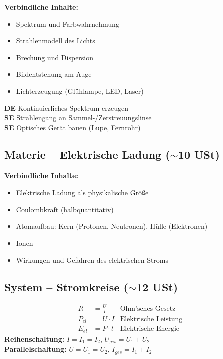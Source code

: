 \documentclass[11pt,a4paper]{article}
\newcommand{\SE}{\textcolor{accentgreen}{\textbf{SE}}}
\newcommand{\DE}{\textcolor{physikblue}{\textbf{DE}}}
\begin{document}
\textbf{Verbindliche Inhalte:}
\begin{itemize}[leftmargin=0.5cm, itemsep=1pt]
\item Spektrum und Farbwahrnehmung
\item Strahlenmodell des Lichts
\item Brechung und Dispersion
\item Bildentstehung am Auge
\item Lichterzeugung (Glühlampe, LED, Laser)
\end{itemize}

\begin{experimentbox}
\DE{} Kontinuierliches Spektrum erzeugen\\
\SE{} Strahlengang an Sammel-/Zerstreuungslinse\\
\SE{} Optisches Gerät bauen (Lupe, Fernrohr)
\end{experimentbox}

\subsection{Materie -- Elektrische Ladung ($\sim$10 USt)}

\textbf{Verbindliche Inhalte:}
\begin{itemize}[leftmargin=0.5cm, itemsep=1pt]
\item Elektrische Ladung als physikalische Größe
\item Coulombkraft (halbquantitativ)
\item Atomaufbau: Kern (Protonen, Neutronen), Hülle (Elektronen)
\item Ionen
\item Wirkungen und Gefahren des elektrischen Stroms
\end{itemize}

\subsection{System -- Stromkreise ($\sim$12 USt)}

\begin{formelbox}
\begin{align*}
R &= \frac{U}{I} & \text{Ohm'sches Gesetz} \\
P_{el} &= U \cdot I & \text{Elektrische Leistung} \\
E_{el} &= P \cdot t & \text{Elektrische Energie}
\end{align*}
\textbf{Reihenschaltung:} $I = I_1 = I_2$, \quad $U_{ges} = U_1 + U_2$\\
\textbf{Parallelschaltung:} $U = U_1 = U_2$, \quad $I_{ges} = I_1 + I_2$
\end{formelbox}
\end{document}
